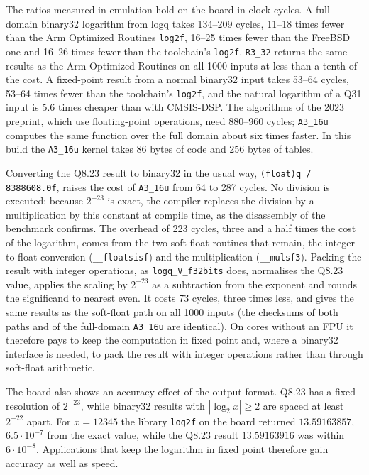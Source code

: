 \documentclass[preprint,12pt]{elsarticle}
\begin{document}
The ratios measured in emulation hold on the board in clock cycles. A
full-domain binary32 logarithm from logq takes 134--209 cycles, 11--18 times
fewer than the Arm Optimized Routines \texttt{log2f}, 16--25 times fewer than
the FreeBSD one and 16--26 times fewer than the toolchain's \texttt{log2f}.
\texttt{R3\_32} returns the same results as the Arm Optimized Routines on all
1000 inputs at less than a tenth of the cost. A fixed-point result from a
normal binary32 input takes 53--64 cycles, 53--64 times fewer than the
toolchain's \texttt{log2f}, and the natural logarithm of a Q31 input is 5.6
times cheaper than with CMSIS-DSP. The algorithms of the 2023 preprint, which use
floating-point operations, need 880--960 cycles; \texttt{A3\_16u} computes the
same function over the full domain about six times faster. In this build the
\texttt{A3\_16u} kernel takes 86 bytes of code and 256 bytes of tables.

Converting the Q8.23 result to binary32 in the usual way,
\texttt{(float)q / 8388608.0f}, raises the cost of \texttt{A3\_16u} from 64
to 287 cycles. No division is executed: because $2^{-23}$ is exact, the
compiler replaces the division by a multiplication by this constant at
compile time, as the disassembly of the benchmark confirms. The overhead of 223 cycles, three and a half times
the cost of the logarithm, comes from the two soft-float routines that remain, the
integer-to-float conversion (\texttt{\_\_floatsisf}) and the multiplication
(\texttt{\_\_mulsf3}). Packing the result with integer operations, as
\texttt{logq\_V\_f32bits} does, normalises the Q8.23 value, applies the
scaling by $2^{-23}$ as a subtraction from the exponent and rounds the
significand to nearest even. It costs 73 cycles, three times less, and gives the
same results as the soft-float path on all 1000 inputs (the checksums of both
paths and of the full-domain \texttt{A3\_16u} are identical). On cores without
an FPU it therefore pays to keep the computation in fixed point and, where a
binary32 interface is needed, to pack the result with integer operations
rather than through soft-float arithmetic.

The board also shows an accuracy effect of the output format. Q8.23 has a
fixed resolution of $2^{-23}$, while binary32 results with $|\log_2 x|\ge2$
are spaced at least $2^{-22}$ apart. For $x=12345$ the library \texttt{log2f}
on the board returned $13.59163857$, $6.5\cdot10^{-7}$ from the exact value,
while the Q8.23 result $13.59163916$ was within $6\cdot10^{-8}$. Applications
that keep the logarithm in fixed point therefore gain accuracy as well as
speed.
\end{document}
